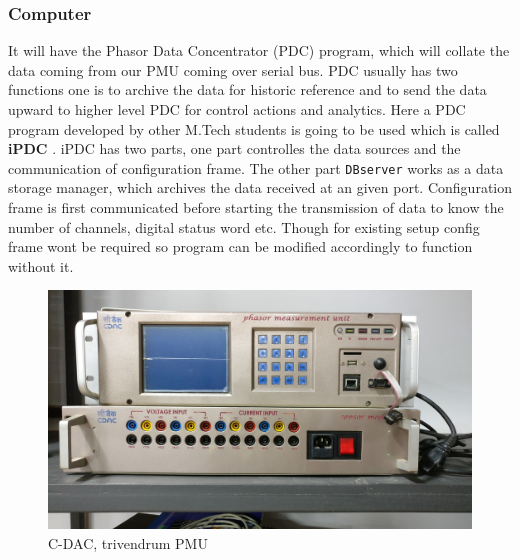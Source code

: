 \subsubsection{Computer}
It will have the Phasor Data Concentrator (PDC) program, which will collate the data coming from our PMU coming over serial bus. PDC  usually has two functions one is to archive the data for historic reference and to send the data upward to higher level PDC for control actions and analytics. Here a PDC program developed by other M.Tech students is going to be used which is called \textbf{iPDC} \cite{site:ipdc}. iPDC has two parts, one part controlles the data sources and the communication of configuration frame. The other part \texttt{DBserver} works as a data storage manager, which archives the data received at an given port. Configuration frame is first communicated before starting the transmission of data to know the number of channels, digital status word etc.
Though for existing setup config frame wont be required so program can be modified accordingly to function without it.

\begin{figure}[t]
\includegraphics[width=\textwidth]{fig/cdac_pmu.jpg}
\caption{C-DAC, trivendrum PMU}
\label{fig:cdac_pmu}
\end{figure}
